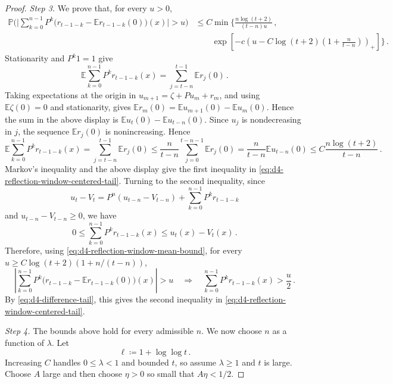 \documentclass[11pt]{amsart}
\theoremstyle{plain}
\theoremstyle{definition}
\newcommand{\E}{\mathbb{E}}
\renewcommand{\P}{\mathbb{P}}
\begin{document}
\begin{proof}
			\emph{Step 3.}
			We prove that, for every $u>0$,
			\begin{equation}\label{eq:d4-reflection-window-centered-tail}
			\begin{split}
				\P\biggl(\biggl|\sum_{k=0}^{n-1}P^k
				\bigl(r_{t-1-k}-\E r_{t-1-k}(0)\bigr)(x)\biggr|>u\biggr)
				&\leq
				C\min\Bigg\{
				\frac{n\log(t+2)}{(t-n)u}\, ,\\
				&\qquad
				\exp\left[-c\left(
				u-C\log(t+2)\left(1+\frac{n}{t-n}\right)
				\right)_+\right]
				\Bigg\}\, .
			\end{split}
			\end{equation}
			Stationarity and $P^k1=1$ give
			\[
				\E\sum_{k=0}^{n-1}P^kr_{t-1-k}(x)
				=
				\sum_{j=t-n}^{t-1}\E r_j(0)\, .
			\]
			Taking expectations at the origin in $u_{m+1}=\zeta+Pu_m+r_m$, and
			using $\E\zeta(0)=0$ and stationarity, gives
			$\E r_m(0)=\E u_{m+1}(0)-\E u_m(0)$. Hence the sum in the above
			display is $\E u_t(0)-\E u_{t-n}(0)$.
			Since $u_j$ is nondecreasing in $j$, the sequence $\E r_j(0)$ is
			nonincreasing. Hence
			\begin{equation}\label{eq:d4-reflection-window-mean-bound}
				\E\sum_{k=0}^{n-1}P^kr_{t-1-k}(x)
				=
				\sum_{j=t-n}^{t-1}\E r_j(0)
				\leq
				\frac{n}{t-n}\sum_{j=0}^{t-n-1}\E r_j(0)
				=
				\frac{n}{t-n}\E u_{t-n}(0)
				\leq
				C \frac{n\log(t+2)}{t-n} \, .
			\end{equation}
			Markov's inequality and the above display give the first inequality in
			\eqref{eq:d4-reflection-window-centered-tail}.
			Turning to the second inequality, since
			\[
				u_t-V_t=P^n(u_{t-n}-V_{t-n})+\sum_{k=0}^{n-1}P^kr_{t-1-k}
			\]
			and $u_{t-n}-V_{t-n}\geq0$, we have
			\[
				0\leq
				\sum_{k=0}^{n-1}P^kr_{t-1-k}(x)
				\leq u_t(x)-V_t(x)\, .
			\]
			Therefore, using \eqref{eq:d4-reflection-window-mean-bound}, for every $u\geq C\log(t+2)(1+n/(t-n))$, 
			\[
				\left|
				\sum_{k=0}^{n-1}P^k
				\bigl(r_{t-1-k}-\E r_{t-1-k}(0)\bigr)(x)
				\right|>u
				\quad\Longrightarrow\quad
				\sum_{k=0}^{n-1}P^kr_{t-1-k}(x)>\frac u2 \, . 
			\]
			By \eqref{eq:d4-difference-tail}, this gives the second inequality in
			\eqref{eq:d4-reflection-window-centered-tail}.

			\emph{Step 4.}
			The bounds above hold for every admissible $n$. We now choose $n$
			as a function of $\lambda$. Let
			\[
				\ell\coloneqq1+\log\log t\, .
			\]
			Increasing $C$ handles $0\leq\lambda<1$ and bounded $t$, so assume
			$\lambda\geq1$ and $t$ is large. Choose $A$ large and then choose
			$\eta>0$ so small that $A\eta<1/2$.


\end{proof}
\end{document}

